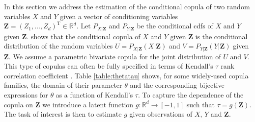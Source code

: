 \documentclass{article}
\begin{document}
In this section we address the estimation of the conditional copula of two
random variables $X$ and $Y$ given a vector of conditioning variables
$\mathbf{Z}=(Z_1,\ldots,Z_d)^\text{T}\in \mathbb{R}^d$.  Let $P_{X|\mathbf{Z}}$
and $P_{Y|\mathbf{Z}}$ be the conditional cdfs of $X$ and $Y$ given
$\mathbf{Z}$.  \citet{Patton2006} shows that the conditional copula of $X$ and
$Y$ given $\mathbf{Z}$ is the conditional distribution of the random variables
$U=P_{X|\mathbf{Z}}(X|\mathbf{Z})$ and $V=P_{Y|\mathbf{Z}}(Y|\mathbf{Z})$ given
$\mathbf{Z}$.  We assume a parametric bivariate copula for the joint
distribution of $U$ and $V$.  This type of copulas can often be fully specified
in terms of Kendall's $\tau$ rank correlation coefficient \cite{Joe1997}.
Table \ref{table:thetatau} shows, for some widely-used copula families, the domain of their
parameter $\theta$ and the corresponding bijective expressions for $\theta$ as
a function of Kendall's $\tau$. To capture the dependence of the copula on
$\mathbf{Z}$ we introduce a latent function $g:\mathbb{R}^d\rightarrow[-1,1]$
such that $\tau = g(\mathbf{Z})$.  The task of interest is then to estimate $g$
given observations of $X$, $Y$ and $\mathbf{Z}$.
\end{document}
